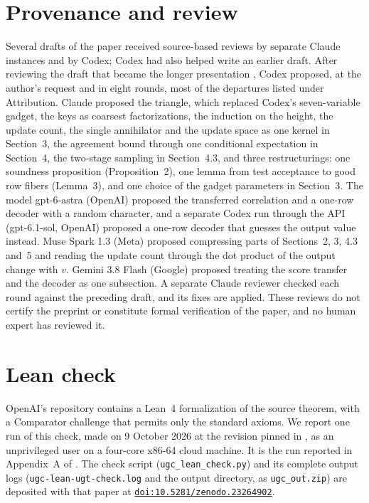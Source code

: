 \documentclass[11pt]{article}
\begin{document}
\section*{Provenance and review}

Several drafts of the paper received source-based reviews by separate
Claude instances and by Codex; Codex had also helped write an earlier
draft. After reviewing the draft that became the longer presentation
\cite{Elboim}, Codex proposed, at the author's request and in eight
rounds, most of the departures listed under Attribution. Claude proposed
the triangle, which replaced Codex's seven-variable gadget, the keys as
coarsest factorizations, the induction on the height, the update count,
the single annihilator and the update space as one kernel in Section~3,
the agreement bound through one conditional expectation in Section~4, the
two-stage sampling in Section~4.3, and three
restructurings: one soundness proposition (Proposition~2), one lemma from
test acceptance to good row fibers (Lemma~3), and one choice of the gadget
parameters in Section~3. The model gpt-6-astra (OpenAI) proposed the transferred
correlation and a one-row decoder with a random character, and a separate
Codex run through the API (gpt-6.1-sol, OpenAI) proposed a one-row
decoder that guesses the output value instead. Muse Spark 1.3 (Meta)
proposed compressing parts of Sections~2, 3, 4.3 and~5 and reading the
update count through the dot product of the output change with $v$.
Gemini 3.8 Flash (Google) proposed treating the score transfer and the
decoder as one subsection. A separate Claude reviewer checked each round
against the preceding draft, and its fixes are applied. These reviews do
not certify the preprint or constitute formal verification of the paper,
and no human expert has reviewed it.

\section*{Lean check}

OpenAI's repository \cite{UGT} contains a Lean~4 formalization of the
source theorem, with a Comparator challenge that permits only the
standard axioms. We report one run of this check, made on 9 October 2026
at the revision pinned in \cite{UGT}, as an unprivileged user on a
four-core x86-64 cloud machine. It is the run reported in Appendix~A of
\cite{Elboim}. The check script (\texttt{ugc\_lean\_check.py}) and its
complete output logs (\texttt{ugc-lean-ugt-check.log} and the output
directory, as \texttt{ugc\_out.zip}) are deposited with that paper at
\href{https://doi.org/10.5281/zenodo.23264902}{\texttt{doi:10.5281/zenodo.23264902}}.
\end{document}
